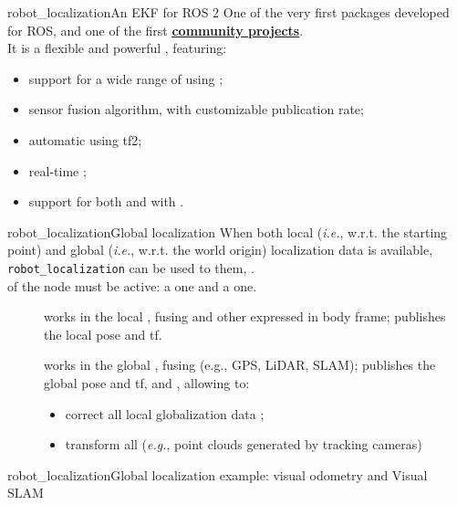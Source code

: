 \begin{frame}{robot\_localization}{An EKF for ROS 2}
  One of the very first packages developed for ROS, and one of the first \href{https://github.com/cra-ros-pkg/robot_localization}{\color{blue}\underline{\textbf{community projects}}}.\\
  \medskip
  It is a flexible and powerful , featuring:
  \begin{itemize}
    \item support for a wide range of  using ;
    \item {} sensor fusion algorithm, with customizable publication rate;
    \item automatic  using tf2;
    \item real-time ;
    \item support for both  and  with .
  \end{itemize}
\end{frame}
\begin{frame}{robot\_localization}{Global localization}
  When both local (\emph{i.e.}, w.r.t. the starting point) and global (\emph{i.e.}, w.r.t. the world origin) localization data is available, \texttt{robot\_localization} can be used to  them, .\\
  \bigskip
   of the node must be active: a  one and a  one.
  \begin{description}
    \item[] works in the local , fusing  and other  expressed in body frame; publishes the local pose and tf.
    \item[] works in the global , fusing  (e.g., GPS, LiDAR, SLAM); publishes the global pose and tf, and , allowing to:
    \begin{itemize}
      \item correct all local globalization data ;
      \item transform all  (\emph{e.g.}, point clouds generated by tracking cameras) 
    \end{itemize}
  \end{description}
\end{frame}
\begin{frame}{robot\_localization}{Global localization example: visual odometry and Visual SLAM}
  \centering
\end{frame}
